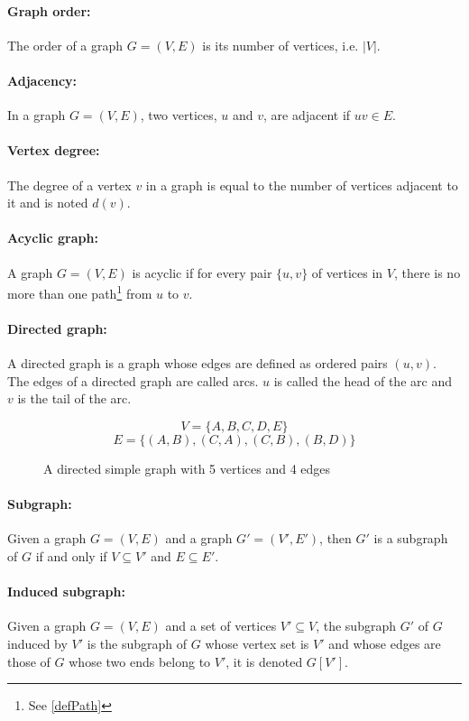 \paragraph{Graph order:}
The order of a graph $G=(V,E)$ is its number of vertices, i.e. $|V|$.

\paragraph{Adjacency:}
In a graph $G=(V,E)$, two vertices, $u$ and $v$, are adjacent if $uv \in E$.

\paragraph{Vertex degree:}
The degree of a vertex $v$ in a graph is equal to the number of
vertices adjacent to it and is noted $d(v)$.

\paragraph{Acyclic graph:}
A graph $G = (V,E)$ is acyclic if for every pair $\{u,v\}$ of vertices in $V$,
there is no more than one path\footnote{See \ref{defPath}} from $u$ to $v$.

\paragraph{Directed graph:} 
A directed graph is a graph whose edges are defined as ordered pairs
$(u,v)$. The edges of a directed graph are called arcs. 
$u$ is called the head of the arc and $v$ is the tail of the arc.
\begin{figure}[!h]
  \caption{A directed simple graph with 5 vertices and 4 edges}
  \begin{center}
    
  \end{center}
  $$V = \{A,B,C,D,E\}$$
  $$E = \Big\{(A,B),(C,A),(C,B),(B,D)\Big\}$$
\end{figure}

\paragraph{Subgraph:}
Given a graph $G = (V,E)$ and a graph $G' = (V',E')$, then $G'$ is a subgraph of $G$ 
if and only if $V \subseteq V'$ and $E \subseteq E'$.

\paragraph{Induced subgraph:}
Given a graph $G = (V,E)$ and a set of vertices $V' \subseteq V$, the subgraph
$G'$ of $G$ induced by $V'$ is the subgraph of $G$ whose vertex set is $V'$ and
whose edges are those of $G$ whose two ends belong to $V'$, it is denoted
$G[V']$.

